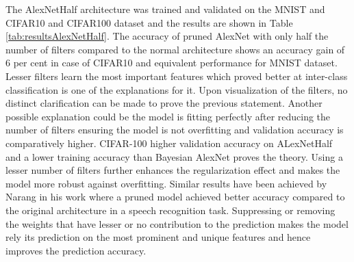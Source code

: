 The AlexNetHalf architecture was trained and validated on the MNIST and CIFAR10 and CIFAR100 dataset and the results are shown in Table \ref{tab:resultsAlexNetHalf}. The accuracy of pruned AlexNet with only half the number of filters compared to the normal architecture shows an accuracy gain of 6 per cent in case of CIFAR10 and equivalent performance for MNIST dataset. Lesser filters learn the most important features which proved better at inter-class classification is one of the explanations for it. Upon visualization of the filters, no distinct clarification can be made to prove the previous statement.  
Another possible explanation could be the model is fitting perfectly after reducing the number of filters ensuring the model is not overfitting and validation accuracy is comparatively higher. CIFAR-100 higher validation accuracy on ALexNetHalf and a lower training accuracy than Bayesian AlexNet proves the theory. Using a lesser number of filters further enhances the regularization effect and makes the model more robust against overfitting. Similar results have been achieved by Narang \cite{DBLP:journals/corr/NarangDSE17} in his work where a pruned model achieved better accuracy compared to the original architecture in a speech recognition task. Suppressing or removing the weights that have lesser or no contribution to the prediction makes the model rely its prediction on the most prominent and unique features and hence improves the prediction accuracy.

\begin{table}[H]
\tiny
    \centering
    \renewcommand{\arraystretch}{1.5}
    \renewcommand{\arraystretch}{1.5}
    \caption{Comparison of validation accuracies (in percentage) for AlexNet with variational inference (VI), AlexNet with frequentist inference and AlexNet with half number of filters halved for MNIST, CIFAR-10 and CIFAR-100 datasets.}
    \label{tab:resultsAlexNetHalf}
\end{table}

